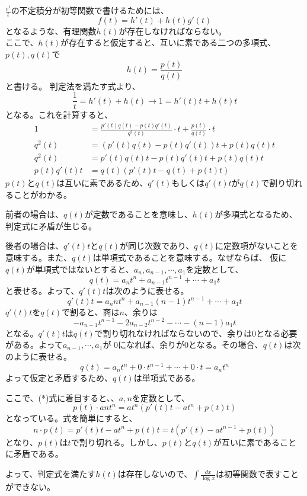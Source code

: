 \documentclass[a4j,dvipdfmx]{jsarticle}
\begin{document}
$\displaystyle\frac{e^t}{t}$の不定積分が初等関数で書けるためには、
\begin{equation*}
    f(t)=h'(t)+h(t)g'(t)
\end{equation*}
となるような、有理関数$h(t)$が存在しなければならない。\\
ここで、$h(t)$が存在すると仮定すると、互いに素である二つの多項式、$p(t),q(t)$で
\begin{equation*}
    h(t)=\frac{p(t)}{q(t)}
\end{equation*}
と書ける。
判定法を満たす式より、
\begin{equation*}
    \frac{1}{t}=h'(t)+h(t)\to 1=h'(t)t+h(t)t
\end{equation*}
となる。これを計算すると、
\begin{align*}
    1&=\frac{p'(t)q(t)-p(t)q'(t)}{q^2(t)}\cdot t +\frac{p(t)}{q(t)}\cdot t\\
    q^2(t)&=(p'(t)q(t)-p(t)q'(t))t+p(t)q(t)t\\
    q^2(t)&=p'(t)q(t)t-p(t)q'(t)t+p(t)q(t)t\\
    p(t)q'(t)t&=q(t)(p'(t)t-q(t)+p(t)t)\tag{*}
\end{align*}
$p(t)$と$q(t)$は互いに素であるため、$q'(t)$もしくは$q'(t)t$が$q(t)$で割り切れることがわかる。

前者の場合は、$q(t)$が定数であることを意味し、$h(t)$が多項式となるため、判定式に矛盾が生じる。

後者の場合は、$q'(t)t$と$q(t)$が同じ次数であり、$q(t)$に定数項がないことを意味する。また、$q(t)$は単項式であることを意味する。なぜならば、
仮に$q(t)$が単項式ではないとすると、$a_n,a_{n-1},\cdots,a_1$を定数として、
\begin{equation*}
    q(t)=a_n t^n+a_{n-1}t^{n-1}+\cdots+a_1 t
\end{equation*}
と表せる。よって、$q'(t)t$は次のように表せる。
\begin{equation*}
    q'(t)t=a_n n t^n+a_{n-1}(n-1)t^{n-1}+\cdots+a_1 t
\end{equation*}
$q'(t)t$を$q(t)$で割ると、商は$n$、余りは
\begin{equation*}
    -a_{n-1}t^{n-1}-2a_{n-2}t^{n-2}-\cdots -(n-1)a_1t
\end{equation*}
となる。$q'(t)t$は$q(t)$で割り切れなければならないので、余りは$0$となる必要がある。よって$a_{n-1},\cdots,a_1$が
0になれば、余りが0となる。その場合、$q(t)$は次のように表せる。
\begin{equation*}
    q(t)=a_n t^n+0\cdot t^{n-1}+\cdots+0\cdot t=a_n t^n
\end{equation*}
よって仮定と矛盾するため、$q(t)$は単項式である。

ここで、(*)式に着目すると、、$a,n$を定数として、
\begin{equation*}
    p(t)\cdot ant^n=at^n(p'(t)t-at^n+p(t)t)
\end{equation*}
となっている。式を簡単にすると、
\begin{equation*}
    n\cdot p(t)=p'(t)t-at^n+p(t)t=t(p'(t)-at^{n-1}+p(t))
\end{equation*}
となり、$p(t)$は$t$で割り切れる。しかし、$p(t)$と$q(t)$が互いに素であることに矛盾である。

よって、判定式を満たす$h(t)$は存在しないので、$\displaystyle \int \frac{dx}{\log x}$は初等関数で表すことができない。
\end{document}
